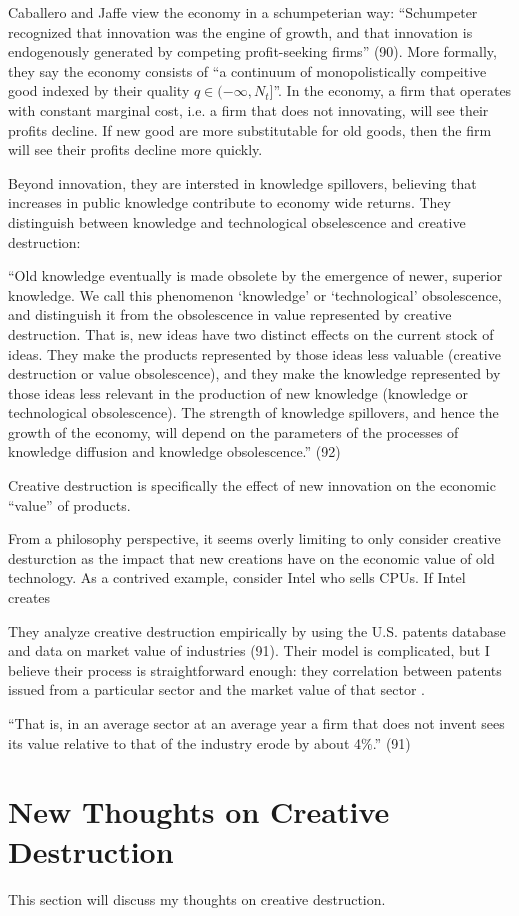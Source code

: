 \documentclass[11pt]{article}
\begin{document}
Caballero and Jaffe view the economy in a schumpeterian way: ``Schumpeter recognized that innovation was the engine of growth, and that innovation is endogenously generated by competing profit-seeking firms'' (90). 
More formally, they say the economy consists of ``a continuum of monopolistically compeitive good indexed by their quality $q \in (-\infty, N_t]$''.
In the economy, a firm that operates with constant marginal cost, i.e. a firm that does not innovating, will see their profits decline. 
If new good are more substitutable for old goods, then the firm will see their profits decline more quickly.

Beyond innovation, they are intersted in knowledge spillovers, believing that increases in public knowledge contribute to economy wide returns.
They distinguish between knowledge and technological obselescence and creative destruction:
\begin{displayquote}
``Old knowledge eventually is made obsolete by the emergence of newer, superior knowledge. We call this phenomenon `knowledge' or `technological' obsolescence, and distinguish it from the obsolescence in value represented by creative destruction.
That is, new ideas have two distinct effects on the current stock of ideas. 
They make the products represented by those ideas less valuable (creative destruction or value obsolescence), and they make the knowledge represented by those ideas less relevant in the production of new knowledge (knowledge or technological obsolescence). 
The strength of knowledge spillovers, and hence the growth of the economy, will depend on the parameters of the processes of knowledge diffusion and knowledge obsolescence.'' (92)
\end{displayquote}
Creative destruction is specifically the effect of new innovation on the economic ``value'' of products.

From a philosophy perspective, it seems overly limiting to only consider creative desturction as the impact that new creations have on the economic value of old technology.
As a contrived example, consider Intel who sells CPUs. 
If Intel creates 







\newpage
They analyze creative destruction empirically by using the U.S. patents database and data on market value of industries (91).
Their model is complicated, but I believe their process is straightforward enough: they correlation between patents issued from a particular sector and the market value of that sector . 
\begin{displayquote}
    ``That is, in an average sector at an average year a firm that does not invent sees its value relative to that of the industry erode by about 4\%.'' (91)
\end{displayquote}


\newpage
\section{New Thoughts on Creative Destruction}
This section will discuss my thoughts on creative destruction.
\end{document}
